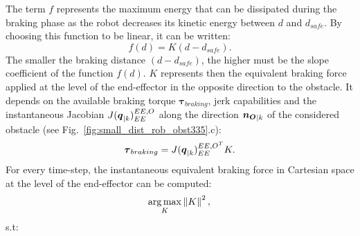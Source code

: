 \documentclass[letterpaper, 10 pt, conference]{ieeeconf}      %
\newcommand{\vect}[1]{\mbox{\boldmath${#1}$}}%
\DeclareMathOperator*{\argmax}{arg\,max}
\begin{document}
The term $f$ represents the maximum energy that can be dissipated during the braking phase as the robot decreases its kinetic energy between $d$ and $d_{safe}$. By choosing this function to be linear, it can be written:
\begin{equation}
f(d) = K (d - d_{safe}).
\label{eq:k_fd}
\end{equation}
The smaller the braking distance $(d-d_{safe})$, the higher must be the slope coefficient of the function $f(d)$. $K$ represents then the equivalent braking force applied at the level of the end-effector in the opposite direction to the obstacle. It depends on the available braking torque $\boldsymbol{\tau}_{braking}$, jerk capabilities and the instantaneous Jacobian $J(\vect{q}_{|k})_{EE}^{{EE,O}}$ along the direction $\vect{n_{O}}_{|k}$ of the considered obstacle (see Fig.~\ref{fig:small_dist_rob_obst335}.c): 
\begin{equation}
\boldsymbol{\tau}_{braking}  = J(\vect{q}_{|k})_{EE}^{{EE,O}^T} K.
\end{equation}
For every time-step, the instantaneous equivalent braking force in Cartesian space at the level of the end-effector can be computed:
\begin{equation}
\argmax \limits_{K} \left\|K\right\|^{2},
\raisetag{-.5em} \\
\label{eq:K_maximizing_opt}
\end{equation}
s.t: 
\end{document}

